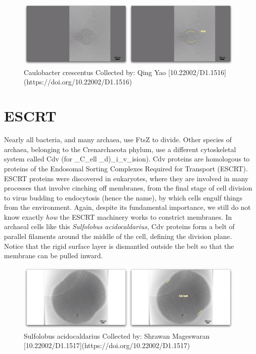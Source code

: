 \documentclass[]{tufte-book}
\begin{document}
\begin{figure}
\includegraphics{movie_stills/5_10} \caption[Caulobacter crescentus Collected by]{Caulobacter crescentus Collected by: Qing Yao [10.22002/D1.1516](https://doi.org/10.22002/D1.1516)}\label{fig:unnamed-chunk-96}
\end{figure}

\section{ESCRT}\label{escrt}

Nearly all bacteria, and many archaea, use FtsZ to divide. Other species
of archaea, belonging to the Crenarchaeota phylum, use a different
cytoskeletal system called Cdv (for \_C\_ell \_d)\_i\_v\_ision). Cdv
proteins are homologous to proteins of the Endosomal Sorting Complexes
Required for Transport (ESCRT). ESCRT proteins were discovered in
eukaryotes, where they are involved in many processes that involve
cinching off membranes, from the final stage of cell division to virus
budding to endocytosis (hence the name), by which cells engulf things
from the environment. Again, despite its fundamental importance, we
still do not know exactly \emph{how} the ESCRT machinery works to
constrict membranes. In archaeal cells like this \emph{Sulfolobus
acidocaldarius}, Cdv proteins form a belt of parallel filaments around
the middle of the cell, defining the division plane. Notice that the
rigid surface layer is dismantled outside the belt so that the membrane
can be pulled inward.

\begin{figure}
\includegraphics{movie_stills/5_11} \caption[Sulfolobus acidocaldarius Collected by]{Sulfolobus acidocaldarius Collected by: Shrawan Mageswaran [10.22002/D1.1517](https://doi.org/10.22002/D1.1517)}\label{fig:unnamed-chunk-97}
\end{figure}
\end{document}
